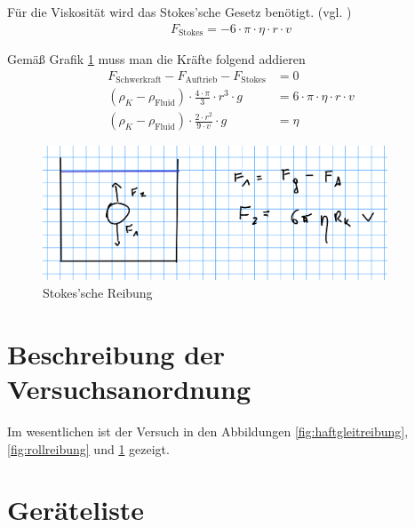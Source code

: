 \documentclass{article}
\begin{document}
Für die Viskosität wird das Stokes'sche Gesetz benötigt. (vgl. \cite{demtr1})
\begin{align}
F_{\text{Stokes}} = -6\cdot \pi \cdot \eta \cdot r \cdot v
\end{align}

Gemäß Grafik \ref{fig:stokes} muss man die Kräfte folgend addieren
\begin{align*}
F_{\text{Schwerkraft}} - F_{\text{Auftrieb}} - F_{\text{Stokes}} &= 0 \\
(\rho_K - \rho_{\text{Fluid}})\cdot \frac{4\cdot \pi}{3} \cdot r^3 \cdot g &= 6\cdot \pi \cdot \eta \cdot r\cdot v \\
(\rho_K - \rho_{\text{Fluid}})\cdot \frac{2\cdot r^2 }{9 \cdot v} \cdot g &= \eta 
\end{align*}



\begin{figure}[H]
\includegraphics[height=4cm]{stokes.png}
\caption{Stokes'sche Reibung}
\label{fig:stokes}
\end{figure}


\newpage

\section{Beschreibung der Versuchsanordnung}

Im wesentlichen ist der Versuch in den Abbildungen \ref{fig:haftgleitreibung}, \ref{fig:rollreibung} und \ref{fig:stokes} gezeigt. 





\section{Geräteliste}
\end{document}
